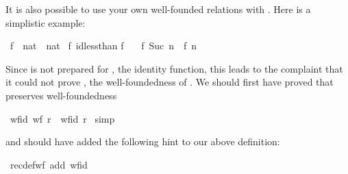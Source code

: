 \begin{isabellebody}
\begin{isamarkuptext}
It is also possible to use your own well-founded relations with .
Here is a simplistic example:%
\end{isamarkuptext}%
\ f\ {\isacharcolon}{\isacharcolon}\ {\isachardoublequote}nat\ {\isasymRightarrow}\ nat{\isachardoublequote}\isanewline
{}\ f\ {\isachardoublequote}id{\isacharparenleft}less{\isacharunderscore}than{\isacharparenright}{\isachardoublequote}\isanewline
{\isachardoublequote}f\ {}\ {\isacharequal}\ {}{\isachardoublequote}\isanewline
{\isachardoublequote}f\ {\isacharparenleft}Suc\ n{\isacharparenright}\ {\isacharequal}\ f\ n{\isachardoublequote}%
\begin{isamarkuptext}%
Since  is not prepared for , the identity
function, this leads to the complaint that it could not prove
, the well-foundedness of . We should first have proved that  preserves well-foundedness%
\end{isamarkuptext}%
\ wf{\isacharunderscore}id{\isacharcolon}\ {\isachardoublequote}wf\ r\ {\isasymLongrightarrow}\ wf{\isacharparenleft}id\ r{\isacharparenright}{\isachardoublequote}\isanewline
{}\ simp%
\begin{isamarkuptext}%
\noindent
and should have added the following hint to our above definition:%
\end{isamarkuptext}%
{\isacharparenleft}\ recdef{\isacharunderscore}wf\ add{\isacharcolon}\ wf{\isacharunderscore}id{\isacharparenright}\end{isabellebody}%
